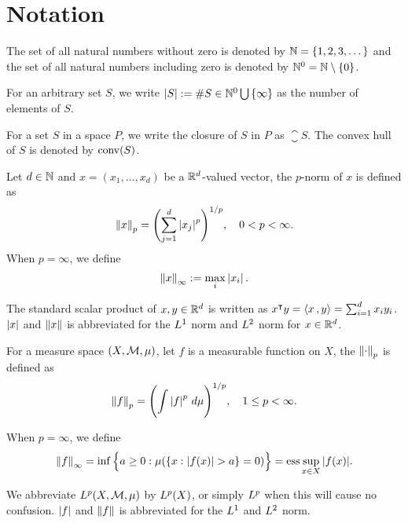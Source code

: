 \chapter*{Notation}
\label{c:Notation}


The set of all natural numbers without zero is denoted by $\mathbb{N} =
\{1,2,3,\dots\}$ and the set of all natural numbers including zero is denoted by
$\mathbb{N}^0 = \mathbb{N} \setminus \{0\}$. 

For an arbitrary set $S$, we write $\left| S \right| := \# S \in \mathbb{N}^0 \bigcup\,
\{\infty\}$ as the number of elements of $S$.

For a set $S$ in a space $P$, we write the closure of $S$ in $P$ as
$\closure{S}$. The convex hull of $S$ is denoted by $\operatorname*{conv}(S)$.

Let $d \in \mathbb{N}$ and $x = (x_1, \dots, x_d)$ be a $\mathbb{R}^d$-valued vector, the
$p$-norm of $x$ is defined as
\begin{equation*}
    \left\| x \right\|_p = \Biggl( \sum_{j=1}^d \left| x_j \right|^p \Biggr)^{1/p}, \quad
    0 < p < \infty.
\end{equation*}
When $p = \infty$, we define 
\begin{equation*}
    \left\| x \right\|_{\infty} := \max_i \left| x_i \right|.
\end{equation*}

The standard scalar product of $x,y\in\mathbb{R}^d$ is written as $x{}^{\intercal} y = \left\langle x\, , y \right\rangle =
\sum_{i=1}^d x_iy_i$. $\left| x \right|$ and $\left\| x \right\|$ is abbreviated for the $L^{1}$
norm and $L^{2}$ norm for $x \in \mathbb{R}^d$.

For a measure space $(X, \mathcal{M}, \mu)$, let $f$ is a measurable function on
$X$, the $\left\| \cdot \right\|_{p}$ is defined as
\begin{equation*}
    \left\| f \right\|_p = \Biggl( \int \left| f \right|^p \, d\mu \Biggr)^{1/p}, \quad
    1 \leq p < \infty.
\end{equation*}


When $p = \infty$, we define 
\begin{equation*}
    \left\| f \right\|_{\infty} = \inf\Big\{
        a \geq 0:
        \mu(\{x: \left| f(x) \right| > a \} = 0)
    \Big\} = \operatorname*{ess}{\sup_{x\in X} \left| f(x) \right|}.
\end{equation*}

We abbreviate $L^{p}(X, \mathcal{M}, \mu)$ by $L^{p}(X)$, or simply $L^{p}$ when
this will cause no confusion. $\left| f \right|$ and $\left\| f \right\|$ is abbreviated for the
$L^{1}$ and $L^{2}$ norm.

